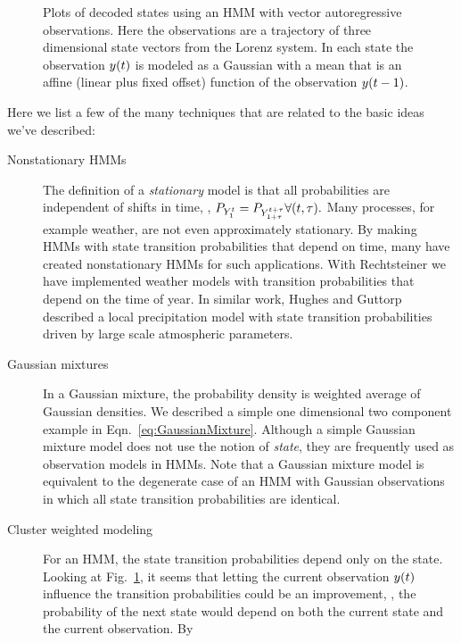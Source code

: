 \begin{figure}[p]
  \caption[Vector autoregressive observation
  models.]%
  {Plots of decoded states using an HMM with vector autoregressive
    observations.  Here the observations are a trajectory of three
    dimensional state vectors from the Lorenz system.  In each state
    the observation ${y}{(t)}$ is modeled as a Gaussian with a mean
    that is an affine (linear plus fixed offset) function of the
    observation ${y}{(t-1)}$.}
  \label{fig:VARGstates}
\end{figure}

Here we list a few of the many techniques that are related to the
basic ideas we've described:
\begin{description}
\item[Nonstationary HMMs] The definition of a \emph{stationary} model
  is that all probabilities are independent of shifts in time, \ie, $
  P_{Y_{1}^{t}} = P_{Y_{1+\tau}^{t+\tau}} \forall (t,\tau).$
  Many processes, for example weather, are not even approximately
  stationary.  By making HMMs with state transition probabilities that
  depend on time, many have created nonstationary HMMs for such
  applications.  With Rechtsteiner\cite{Rechtsteiner2000} we have
  implemented weather models with transition probabilities that depend
  on the time of year.  In similar work, Hughes and
  Guttorp\cite{Hughes99} described a local precipitation model with
  state transition probabilities driven by large scale atmospheric
  parameters.
\item[Gaussian mixtures] In a Gaussian mixture, the probability
  density is weighted average of Gaussian densities.  We described a
  simple one dimensional two component example in
  Eqn.~\eqref{eq:GaussianMixture}.  Although a simple Gaussian mixture
  model does not use the notion of \emph{state}, they are frequently
  used as observation models in HMMs.  Note that a Gaussian mixture
  model is equivalent to the degenerate case of an HMM with Gaussian
  observations in which all state transition probabilities are
  identical.
\item[Cluster weighted modeling] For an HMM, the state transition
  probabilities depend only on the state.  Looking at
  Fig.~\ref{fig:VARGstates}, it seems that letting the current
  observation ${y}{(t)}$ influence the transition probabilities could
  be an improvement, \ie, the probability of the next state would
  depend on both the current state and the current observation.  By

\end{description}
